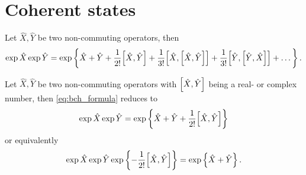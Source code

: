\section{Coherent states}

\begin{theorem}
	Let $\hat{X},\hat{Y}$ be two non-commuting operators, then
	\begin{equation}\label{eq:bch_formula}
		\exp\hat{X}
		\exp\hat{Y}
		=
		\exp\left\{
			\hat{X}
			+
			\hat{Y}
			+
			\frac{1}{2!}
			\comm{\hat{X}}{\hat{Y}}
			+
			\frac{1}{3!}
			\comm{\hat{X}}{\comm{\hat{X}}{\hat{Y}}}
			+
			\frac{1}{3!}
			\comm{\hat{Y}}{\comm{\hat{Y}}{\hat{X}}}
			+
			\dots		
		\right\}
		.
	\end{equation}
\end{theorem}
\begin{corollary}
	Let $\hat{X},\hat{Y}$ be two non-commuting operators with $\comm{\hat{X}}{\hat{Y}}$ being a real- or complex number, then \cref{eq:bch_formula} reduces to
	\begin{equation}\label{eq:bch_formula_reduced1}
		\exp\hat{X}
		\exp\hat{Y}
		=
		\exp\left\{
			\hat{X}
			+
			\hat{Y}
			+
			\frac{1}{2!}
			\comm{\hat{X}}{\hat{Y}}
		\right\}
	\end{equation}
	or equivalently
	\begin{equation}\label{eq:bch_formula_reduced2}
		\exp\hat{X}
		\exp\hat{Y}
		\exp\left\{
			-
			\frac{1}{2!}
			\comm{\hat{X}}{\hat{Y}}
		\right\}
		=
		\exp\left\{
			\hat{X}
			+
			\hat{Y}
		\right\}
		.
	\end{equation}
\end{corollary}

